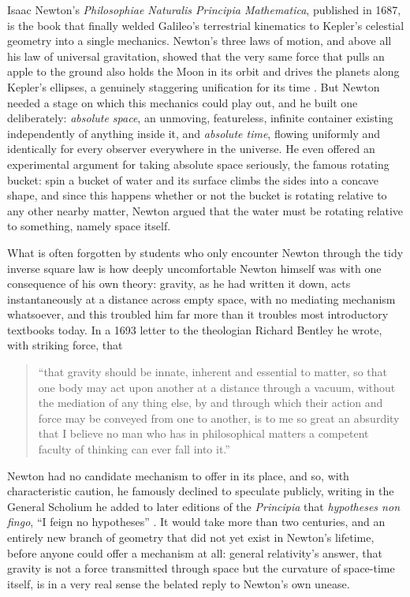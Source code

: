     Isaac Newton's \textit{Philosophiae Naturalis Principia Mathematica}, published in 1687, is the book that finally welded Galileo's terrestrial kinematics to Kepler's celestial geometry into a single mechanics. Newton's three laws of motion, and above all his law of universal gravitation, showed that the very same force that pulls an apple to the ground also holds the Moon in its orbit and drives the planets along Kepler's ellipses, a genuinely staggering unification for its time \citep{newton1999principia}. But Newton needed a stage on which this mechanics could play out, and he built one deliberately: \textit{absolute space}, an unmoving, featureless, infinite container existing independently of anything inside it, and \textit{absolute time}, flowing uniformly and identically for every observer everywhere in the universe. He even offered an experimental argument for taking absolute space seriously, the famous rotating bucket: spin a bucket of water and its surface climbs the sides into a concave shape, and since this happens whether or not the bucket is rotating relative to any other nearby matter, Newton argued that the water must be rotating relative to something, namely space itself.

    What is often forgotten by students who only encounter Newton through the tidy inverse square law is how deeply uncomfortable Newton himself was with one consequence of his own theory: gravity, as he had written it down, acts instantaneously at a distance across empty space, with no mediating mechanism whatsoever, and this troubled him far more than it troubles most introductory textbooks today. In a 1693 letter to the theologian Richard Bentley he wrote, with striking force, that

    \begin{quote}
    ``that gravity should be innate, inherent and essential to matter, so that one body may act upon another at a distance through a vacuum, without the mediation of any thing else, by and through which their action and force may be conveyed from one to another, is to me so great an absurdity that I believe no man who has in philosophical matters a competent faculty of thinking can ever fall into it.'' \citep{newton1958papers}
    \end{quote}

    Newton had no candidate mechanism to offer in its place, and so, with characteristic caution, he famously declined to speculate publicly, writing in the General Scholium he added to later editions of the \textit{Principia} that \textit{hypotheses non fingo}, ``I feign no hypotheses'' \citep{newton1999principia}. It would take more than two centuries, and an entirely new branch of geometry that did not yet exist in Newton's lifetime, before anyone could offer a mechanism at all: general relativity's answer, that gravity is not a force transmitted through space but the curvature of space-time itself, is in a very real sense the belated reply to Newton's own unease.

